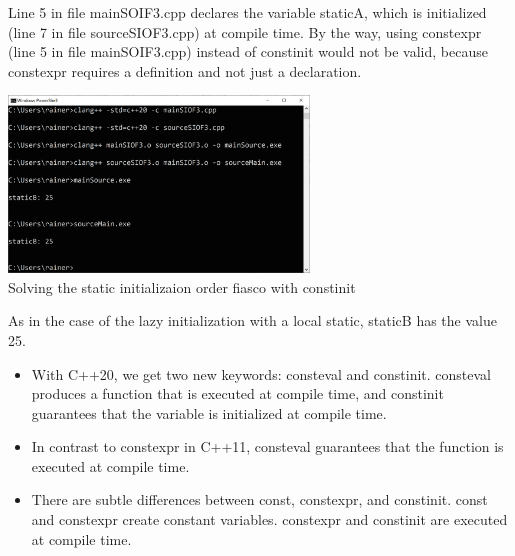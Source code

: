 Line 5 in file mainSOIF3.cpp declares the variable staticA, which is initialized (line 7 in file sourceSIOF3.cpp) at compile time. By the way, using constexpr (line 5 in file mainSOIF3.cpp) instead of constinit would not be valid, because constexpr requires a definition and not just a declaration.

\begin{center}
\includegraphics[width=0.6\textwidth]{content/3/chapter4/images/39.png}\\
Solving the static initializaion order fiasco with constinit
\end{center}

As in the case of the lazy initialization with a local static, staticB has the value 25.

\begin{tcolorbox}[colback=blue!5!white,colframe=blue!75!black,title={Distilled Information}]
\begin{itemize}
\item 
With C++20, we get two new keywords: consteval and constinit. consteval produces a function that is executed at compile time, and constinit guarantees that the variable is initialized at compile time.

\item 
In contrast to constexpr in C++11, consteval guarantees that the function is executed at compile time.

\item 
There are subtle differences between const, constexpr, and constinit. const and constexpr create constant variables. constexpr and constinit are executed at compile time.
\end{itemize}
\end{tcolorbox}	






